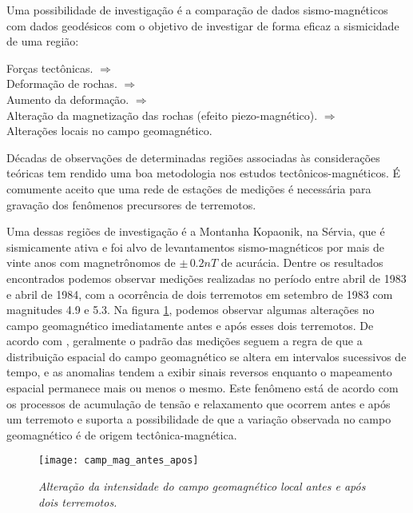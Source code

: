 Uma possibilidade de investiga\c{c}\~ao \'e a compara\c{c}\~ao de dados sismo-magn\'eticos com dados geod\'esicos com o objetivo de investigar de forma eficaz a sismicidade de uma regi\~ao:
\begin{center}
For\c{c}as tect\^onicas. $\Rightarrow$\\
Deforma\c{c}\~ao de rochas. $\Rightarrow$\\
Aumento da deforma\c{c}\~ao. $\Rightarrow$\\
Altera\c{c}\~ao da magnetiza\c{c}\~ao das rochas (efeito piezo-magn\'etico). $\Rightarrow$\\
Altera\c{c}\~oes locais no campo geomagn\'etico.
\end{center}
D\'ecadas de observa\c{c}\~oes de determinadas regi\~oes associadas \`as considera\c{c}\~oes te\'oricas tem rendido uma boa metodologia nos estudos tect\^onicos-magn\'eticos. \'E comumente aceito que uma rede de esta\c{c}\~oes de medi\c{c}\~oes \'e necess\'aria para grava\c{c}\~ao dos fen\^omenos precursores de terremotos.

Uma dessas regi\~oes de investiga\c{c}\~ao \'e a Montanha Kopaonik, na S\'ervia, que \'e sismicamente ativa e foi alvo de levantamentos sismo-magn\'eticos por mais de vinte anos com magnetr\^onomos de $\pm\,0.2 nT$ de acur\'acia. Dentre os resultados encontrados podemos observar medi\c{c}\~oes realizadas no per\'iodo entre abril de 1983 e abril de 1984, com a ocorr\^encia de dois terremotos em setembro de 1983 com magnitudes 4.9 e 5.3. Na figura \ref{fig.camp_mag_ant_apo}, podemos observar algumas altera\c{c}\~oes no campo geomagn\'etico imediatamente antes e ap\'os esses dois terremotos. De acordo com \cite{Rikitake_80}, geralmente o padr\~ao das medi\c{c}\~oes seguem a regra de que a distribui\c{c}\~ao espacial do campo geomagn\'etico se altera em intervalos sucessivos de tempo, e as anomalias tendem a exibir sinais reversos enquanto o mapeamento espacial permanece mais ou menos o mesmo. Este fen\^omeno est\'a de acordo com os processos de acumula\c{c}\~ao de tens\~ao e relaxamento que ocorrem antes e ap\'os um terremoto e suporta a possibilidade de que a varia\c{c}\~ao observada no campo geomagn\'etico \'e de origem tect\^onica-magn\'etica.
\begin{figure}
\centering
\texttt{[image: camp\_mag\_antes\_apos]}
\caption{\textit{Altera\c{c}\~ao da intensidade do campo geomagn\'etico local antes e ap\'os dois terremotos.}}
\label{fig.camp_mag_ant_apo}
\end{figure}


